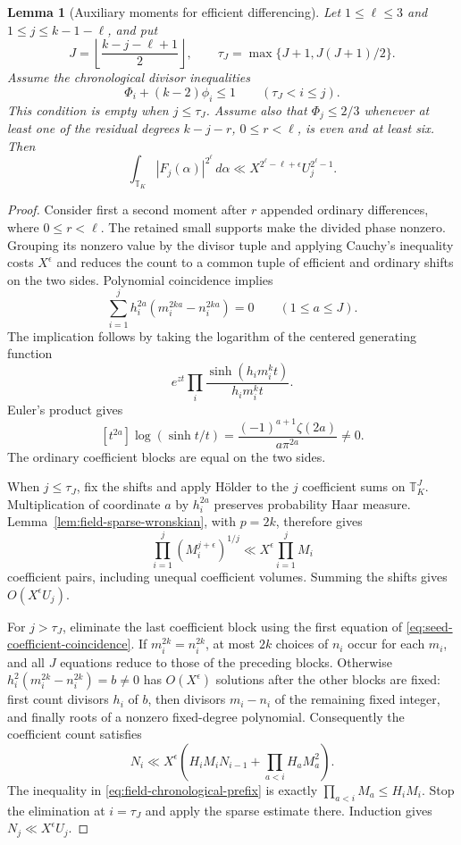 \documentclass[11pt]{amsart}
\newtheorem{lemma}[theorem]{Lemma}
\theoremstyle{definition}
\numberwithin{equation}{section}
\begin{document}
\begin{lemma}[Auxiliary moments for efficient differencing]
\label{lem:field-general-seed-aux}
Let $1\le\ell\le3$ and $1\le j\le k-1-\ell$, and put
\[
 J=\left\lfloor\frac{k-j-\ell+1}{2}\right\rfloor,
 \qquad \tau_J=\max\{J+1,J(J+1)/2\}.
\]
Assume the chronological divisor inequalities
\begin{equation}\label{eq:field-chronological-prefix}
 \Phi_i+(k-2)\phi_i\le1
 \qquad(\tau_J<i\le j).
\end{equation}
This condition is empty when $j\le\tau_J$.
Assume also that $\Phi_j\le2/3$ whenever at least one of the
residual degrees $k-j-r$, $0\le r<\ell$, is even and at least six.
Then
\[
 \int_{\mathbb T_K}|F_j(\alpha)|^{2^\ell}\,d\alpha
 \ll X^{2^\ell-\ell+\epsilon}U_j^{2^\ell-1}.
\]
\end{lemma}
\begin{proof}
Consider first a second moment after $r$ appended ordinary
differences, where $0\le r<\ell$. The retained small supports
make the divided phase nonzero. Grouping its nonzero value by
the divisor tuple and applying Cauchy's inequality costs
$X^\epsilon$ and reduces the count to a common tuple of efficient
and ordinary shifts on the two sides.
Polynomial coincidence implies
\begin{equation}\label{eq:seed-coefficient-coincidence}
 \sum_{i=1}^j h_i^{2a}(m_i^{2ka}-n_i^{2ka})=0
 \qquad(1\le a\le J).
\end{equation}
The implication follows by taking the logarithm of the centered
generating function
\[
 e^{zt}\prod_i\frac{\sinh(h_im_i^kt)}{h_im_i^kt}.
\]
Euler's product gives
\[
 [t^{2a}]\log(\sinh t/t)=
       \frac{(-1)^{a+1}\zeta(2a)}{a\pi^{2a}}\ne0.
\]
The ordinary coefficient blocks are equal on the two sides.

When $j\le\tau_J$, fix the shifts and apply H\"older to the $j$
coefficient sums on $\mathbb T_K^J$.
Multiplication of coordinate $a$ by $h_i^{2a}$ preserves probability
Haar measure. Lemma~\ref{lem:field-sparse-wronskian}, with $p=2k$,
therefore gives
\[
 \prod_{i=1}^j\left(M_i^{j+\epsilon}\right)^{1/j}
 \ll X^\epsilon\prod_{i=1}^j M_i
\]
coefficient pairs, including unequal coefficient volumes.
Summing the shifts gives $O(X^\epsilon U_j)$.

For $j>\tau_J$, eliminate the last coefficient block using the
first equation of \eqref{eq:seed-coefficient-coincidence}.
If $m_i^{2k}=n_i^{2k}$, at most $2k$ choices of $n_i$ occur for
each $m_i$, and all $J$ equations reduce to those of the preceding
blocks. Otherwise
$h_i^2(m_i^{2k}-n_i^{2k})=b\ne0$ has $O(X^\epsilon)$ solutions
after the other blocks are fixed: first count divisors $h_i$ of $b$,
then divisors $m_i-n_i$ of the remaining fixed integer, and finally
roots of a nonzero fixed-degree polynomial.
Consequently the coefficient count satisfies
\[
 N_i\ll X^\epsilon\left(H_iM_iN_{i-1}
                    +\prod_{a<i}H_aM_a^2\right).
\]
The inequality in \eqref{eq:field-chronological-prefix} is exactly
$\prod_{a<i}M_a\le H_iM_i$.
Stop the elimination at $i=\tau_J$ and apply the sparse estimate
there. Induction gives $N_j\ll X^\epsilon U_j$.


\end{proof}
\end{document}
